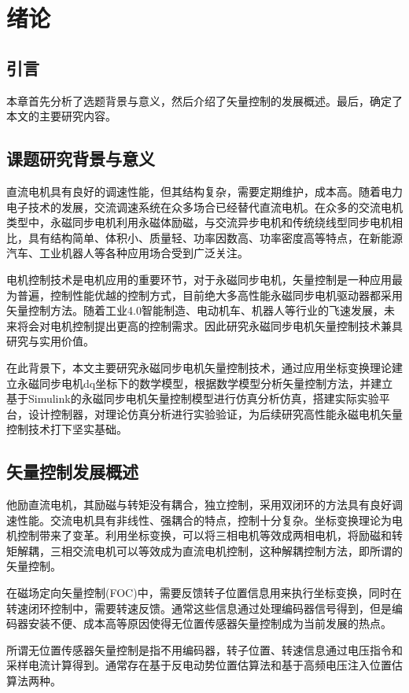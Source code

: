 \chapter{绪论}\label{ch:intr}
\section{引言}
本章首先分析了选题背景与意义，然后介绍了矢量控制的发展概述。最后，确定了本文的主要研究内容。
\section{课题研究背景与意义}
直流电机具有良好的调速性能，但其结构复杂，需要定期维护，成本高。随着电力电子技术的发展，交流调速系统在众多场合已经替代直流电机。在众多的交流电机类型中，永磁同步电机利用永磁体励磁，与交流异步电机和传统绕线型同步电机相比，具有结构简单、体积小、质量轻、功率因数高、功率密度高等特点，在新能源汽车、工业机器人等各种应用场合受到广泛关注\cite{dai_development_2007,msaddek_design_2015,nerg2014direct}。

电机控制技术是电机应用的重要环节，对于永磁同步电机，矢量控制是一种应用最为普遍，控制性能优越的控制方式，目前绝大多高性能永磁同步电机驱动器都采用矢量控制方法。随着工业4.0智能制造、电动机车、机器人等行业的飞速发展，未来将会对电机控制提出更高的控制需求。因此研究永磁同步电机矢量控制技术兼具研究与实用价值。

在此背景下，本文主要研究永磁同步电机矢量控制技术，通过应用坐标变换理论建立永磁同步电机dq坐标下的数学模型，根据数学模型分析矢量控制方法，并建立基于Simulink的永磁同步电机矢量控制模型进行仿真分析仿真，搭建实际实验平台，设计控制器，对理论仿真分析进行实验验证，为后续研究高性能永磁电机矢量控制技术打下坚实基础。
\section{矢量控制发展概述}
他励直流电机，其励磁与转矩没有耦合，独立控制，采用双闭环的方法具有良好调速性能\cite{hughes2013electric}。交流电机具有非线性、强耦合的特点，控制十分复杂。坐标变换理论为电机控制带来了变革。利用坐标变换，可以将三相电机等效成两相电机，将励磁和转矩解耦，三相交流电机可以等效成为直流电机控制，这种解耦控制方法，即所谓的矢量控制\cite{book1,vas1990vector,boldea2008active}。

在磁场定向矢量控制(FOC)中，需要反馈转子位置信息用来执行坐标变换，同时在转速闭环控制中，需要转速反馈。通常这些信息通过处理编码器信号得到，但是编码器安装不便、成本高等原因使得无位置传感器矢量控制成为当前发展的热点\cite{review}。

所谓无位置传感器矢量控制是指不用编码器，转子位置、转速信息通过电压指令和采样电流计算得到。通常存在基于反电动势位置估算法和基于高频电压注入位置估算法两种\cite{xie2015design}。

